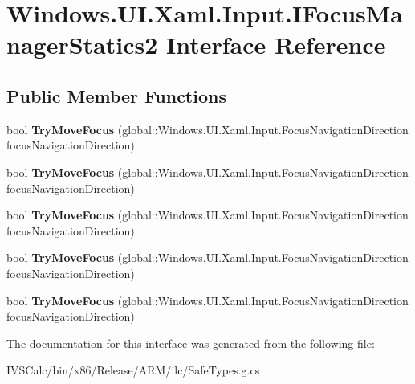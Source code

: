 \hypertarget{interface_windows_1_1_u_i_1_1_xaml_1_1_input_1_1_i_focus_manager_statics2}{}\section{Windows.\+U\+I.\+Xaml.\+Input.\+I\+Focus\+Manager\+Statics2 Interface Reference}
\label{interface_windows_1_1_u_i_1_1_xaml_1_1_input_1_1_i_focus_manager_statics2}
\subsection*{Public Member Functions}
\begin{DoxyCompactItemize}
\item 
\mbox{\label{interface_windows_1_1_u_i_1_1_xaml_1_1_input_1_1_i_focus_manager_statics2_ae79ef1d31b455632dfb2de44bf260fe5}} 
bool {\bfseries Try\+Move\+Focus} (global\+::\+Windows.\+U\+I.\+Xaml.\+Input.\+Focus\+Navigation\+Direction focus\+Navigation\+Direction)
\item 
\mbox{\label{interface_windows_1_1_u_i_1_1_xaml_1_1_input_1_1_i_focus_manager_statics2_ae79ef1d31b455632dfb2de44bf260fe5}} 
bool {\bfseries Try\+Move\+Focus} (global\+::\+Windows.\+U\+I.\+Xaml.\+Input.\+Focus\+Navigation\+Direction focus\+Navigation\+Direction)
\item 
\mbox{\label{interface_windows_1_1_u_i_1_1_xaml_1_1_input_1_1_i_focus_manager_statics2_ae79ef1d31b455632dfb2de44bf260fe5}} 
bool {\bfseries Try\+Move\+Focus} (global\+::\+Windows.\+U\+I.\+Xaml.\+Input.\+Focus\+Navigation\+Direction focus\+Navigation\+Direction)
\item 
\mbox{\label{interface_windows_1_1_u_i_1_1_xaml_1_1_input_1_1_i_focus_manager_statics2_ae79ef1d31b455632dfb2de44bf260fe5}} 
bool {\bfseries Try\+Move\+Focus} (global\+::\+Windows.\+U\+I.\+Xaml.\+Input.\+Focus\+Navigation\+Direction focus\+Navigation\+Direction)
\item 
\mbox{\label{interface_windows_1_1_u_i_1_1_xaml_1_1_input_1_1_i_focus_manager_statics2_ae79ef1d31b455632dfb2de44bf260fe5}} 
bool {\bfseries Try\+Move\+Focus} (global\+::\+Windows.\+U\+I.\+Xaml.\+Input.\+Focus\+Navigation\+Direction focus\+Navigation\+Direction)
\end{DoxyCompactItemize}


The documentation for this interface was generated from the following file\+:\begin{DoxyCompactItemize}
\item 
I\+V\+S\+Calc/bin/x86/\+Release/\+A\+R\+M/ilc/Safe\+Types.\+g.\+cs\end{DoxyCompactItemize}
